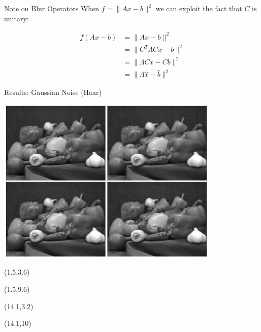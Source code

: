 \documentclass[12pt]{beamer}
\begin{document}
\begin{frame}{Note on Blur Operators}
When $f = \| Ax-b \|^2$ we can exploit the fact that $C$ is unitary:

\begin{align*}
f(Ax-b) &= \| Ax - b \|^2 \\
&= \| C^T\Lambda C x - b \|^2 \\
&= \| \Lambda Cx - Cb \|^2 \\
&= \| \Lambda \hat{x} - \hat{b} \|^2
\end{align*}
\end{frame}

\begin{frame}{Results: Gaussian Noise (Haar)}
\begin{center}
\vspace{-3 mm}
\includegraphics[width = 0.8\textwidth]{../figures/waveletGaussH.pdf} 
\end{center}

\begin{textblock}{5}(1.5,3.6)
\end{textblock}

\begin{textblock}{5}(1.5,9.6)
\end{textblock}

\begin{textblock}{5}(14.1,3.2)
\end{textblock}

\begin{textblock}{5}(14.1,10)
\end{textblock}
\end{frame}
\end{document}
